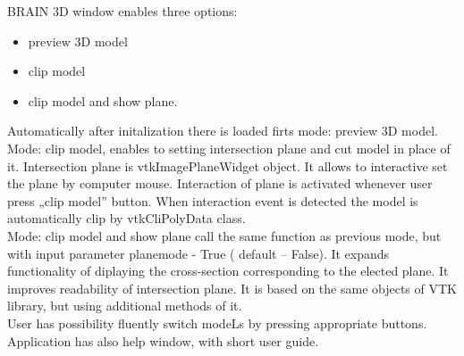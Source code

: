 \indent BRAIN 3D window enables three options:
\begin{itemize}
\item preview 3D model
\item clip model 
\item clip model and show plane.
\end{itemize}
\indent Automatically after initalization there is loaded firts mode: preview 3D model. 
Mode: clip model, enables to setting intersection plane and cut model in place of it. Intersection plane is vtkImagePlaneWidget object. It allows to interactive set the plane by computer mouse. Interaction of plane is activated whenever user press „clip model” button. When interaction event is detected the model is automatically clip by vtkCliPolyData class. \\
\indent Mode:  clip model and show plane call the same function as previous mode, but with input parameter planemode - True ( default – False). It expands functionality of diplaying the cross-section corresponding to the elected plane. It improves readability of intersection plane. It is based on the same objects of VTK library, but using additional methods of it.\\
\indent User has possibility fluently switch modeLs by pressing appropriate buttons. Application has also help window, with short user guide.
